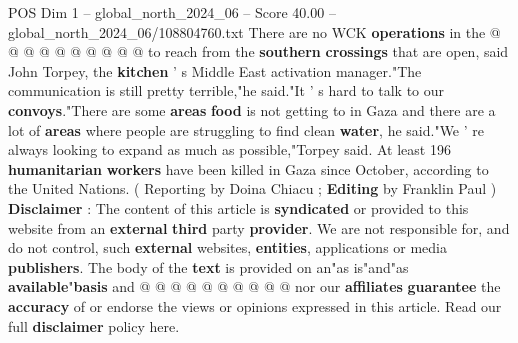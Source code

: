 \begin{textsample}{POS Dim 1 – global\_north\_2024\_06 – Score 40.00 – global\_north\_2024\_06/108804760.txt}
There are no WCK \textbf{operations} in the @ @ @ @ @ @ @ @ @ @ to reach from the \textbf{southern} \textbf{crossings} that are open, said John Torpey, the \textbf{kitchen} ' s Middle East activation manager."The communication is still pretty terrible,"he said."It ' s hard to talk to our \textbf{convoys}."There are some \textbf{areas} \textbf{food} is not getting to in Gaza and there are a lot of \textbf{areas} where people are struggling to find clean \textbf{water}, he said."We ' re always looking to expand as much as possible,"Torpey said.
At least 196 \textbf{humanitarian} \textbf{workers} have been killed in Gaza since October, according to the United Nations. ( Reporting by Doina Chiacu ; \textbf{Editing} by Franklin Paul ) \textbf{Disclaimer} : The content of this article is \textbf{syndicated} or provided to this website from an \textbf{external} \textbf{third} party \textbf{provider}.
We are not responsible for, and do not control, such \textbf{external} websites, \textbf{entities}, applications or media \textbf{publishers}.
The body of the \textbf{text} is provided on an"as is"and"as \textbf{available}"\textbf{basis} and @ @ @ @ @ @ @ @ @ @ nor our \textbf{affiliates} \textbf{guarantee} the \textbf{accuracy} of or endorse the views or opinions expressed in this article.
Read our full \textbf{disclaimer} policy here.

\end{textsample}
